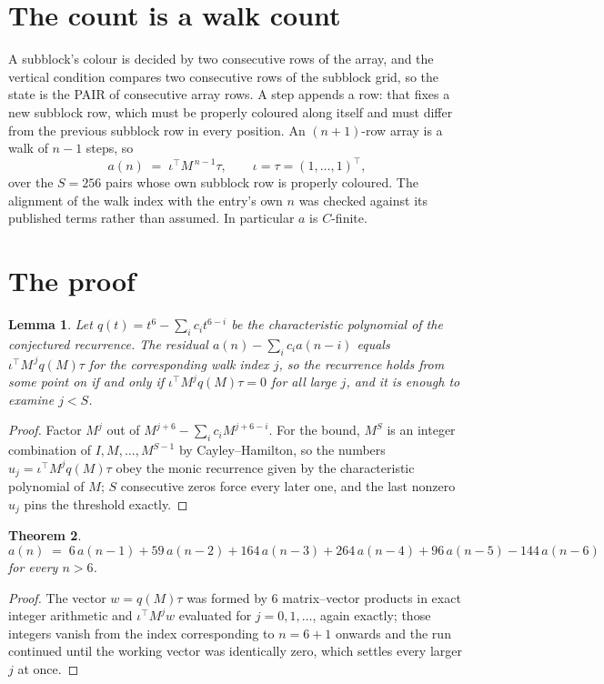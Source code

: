 \documentclass[11pt,a4paper]{article}
\theoremstyle{plain}
\newtheorem{theorem}{Theorem}
\newtheorem{lemma}[theorem]{Lemma}
\theoremstyle{definition}
\begin{document}
\section{The count is a walk count}

A subblock's colour is decided by two consecutive rows of the array, and
the vertical condition compares two consecutive rows of the subblock grid, so the state is the
PAIR of consecutive array rows. A step appends a row: that fixes a new subblock row, which
must be properly coloured along itself and must differ from the previous subblock row in every
position. An $(n+1)$-row array is a walk of $n-1$ steps, so
\[
a(n)\;=\;\iota^{\!\top}M^{\,n-1}\tau,\qquad\iota=\tau=(1,\dots,1)^{\!\top},
\]
over the $S=256$ pairs whose own subblock row is properly coloured.
The alignment of the walk index with the entry's own $n$ was checked against its published
terms rather than assumed. In particular $a$ is $C$-finite.

\section{The proof}

\begin{lemma}\label{lem:crit}
Let $q(t)=t^{6}-\sum_i c_it^{6-i}$ be the characteristic polynomial of the
conjectured recurrence. The residual $a(n)-\sum_ic_ia(n-i)$ equals
$\iota^{\!\top}M^{\,j}q(M)\tau$ for the corresponding walk index $j$, so the recurrence
holds from some point on if and only if $\iota^{\!\top}M^{j}q(M)\tau=0$ for all large $j$,
and it is enough to examine $j<S$.
\end{lemma}

\begin{proof}
Factor $M^{j}$ out of $M^{j+6}-\sum_ic_iM^{j+6-i}$. For the bound, $M^{S}$
is an integer combination of $I,M,\dots,M^{S-1}$ by Cayley--Hamilton, so the numbers
$u_j=\iota^{\!\top}M^{j}q(M)\tau$ obey the monic recurrence given by the characteristic
polynomial of $M$; $S$ consecutive zeros force every later one, and the last nonzero $u_j$
pins the threshold exactly.
\end{proof}

\begin{theorem}
\[
a(n)\;=\;6\,a(n-1) + 59\,a(n-2) + 164\,a(n-3) + 264\,a(n-4) + 96\,a(n-5) - 144\,a(n-6)
\]
for every $n>6$.
\end{theorem}

\begin{proof}
The vector $w=q(M)\tau$ was formed by $6$ matrix--vector products in exact integer
arithmetic and $\iota^{\!\top}M^{j}w$ evaluated for $j=0,1,\dots$, again exactly; those
integers vanish from the index corresponding to $n=6+1$ onwards and the run continued
until the working vector was identically zero, which settles every larger $j$ at once.
\end{proof}
\end{document}
